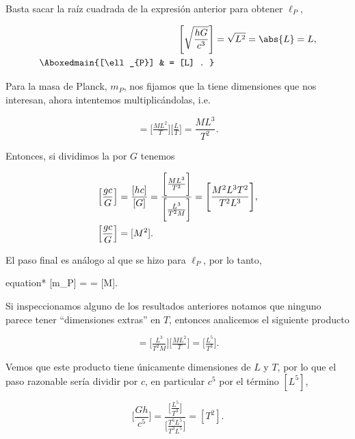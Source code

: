 \documentclass[../main.tex]{subfiles}
\begin{document}
\begin{problema}[10]
	Basta sacar la raíz cuadrada de la expresión anterior para obtener \(\ell_{P}\),

	\begin{align*}
		\Biggl[\sqrt{\dfrac{hG}{c^{3}}}\Biggr] & = \sqrt{L^{2}} = \abs{L} = L, \\
		\Aboxedmain{[\ell_{P}]                 & = [L]
		.
		}
	\end{align*}

	Para la masa de Planck, \(m_{P}\), nos fijamos que la 
	tiene dimensiones que nos interesan, ahora intentemos multiplicándolas, i.e.

	\begin{equation}
		[hc] = \bigl[\tfrac{ML^{2}}{T}\bigr]\bigl[\tfrac{L}{T}\bigr] = \dfrac{ML^{3}}{T^{2}}.
		\label{eq:hTimesC}
	\end{equation}

	Entonces, si dividimos la  por
	\(G\) tenemos

	\begin{align*}
		\Bigl[\dfrac{gc}{G}\Bigr] & = \dfrac{[hc]}{[G]} = \dfrac{\biggl[\tfrac{ML^{3}}{T^{2}}\biggr]}{\biggl[\tfrac{L^{3}}{T^{2}M}\biggr]}
		= \Biggl[\dfrac{M^{2}L^{3}T^{2}}{T^{2}L^{3}}\Biggr],                                                                               \\
		\Bigl[\dfrac{gc}{G}\Bigr] & = [M^{2}].
	\end{align*}

	El paso final es análogo al que se hizo para \(\ell_{P}\), por lo tanto,

	\begin{empheq}[box=\mainresult]{equation*}
		[m_{P}] =  = [M].
	\end{empheq}

	Si inspeccionamos alguno de los resultados anteriores notamos que
	ninguno parece tener ``dimensiones extras'' en \(T\),
	entonces analicemos el siguiente producto

	\begin{equation}
		[Gh] = \biggl[\tfrac{L^{3}}{T^{2}M}\biggr]\biggl[\tfrac{ML^{2}}{T}\biggr]
		= \biggl[\tfrac{L^{5}}{T^{3}}\biggr].
		\label{eq:GTimesH}
	\end{equation}

	Vemos que este producto tiene únicamente dimensiones de \(L\) y \(T\),
	por lo que el paso razonable sería dividir por \(c\), en particular
	\(c^{5}\) por el término \([L^{5}]\),

	\begin{equation*}
		\Biggl[\dfrac{Gh}{c^{5}}\Biggr] = \dfrac{\biggl[\tfrac{L^{5}}{T^{3}}\biggr]}{\biggl[\tfrac{T^{5}L^{5}}{T^{3}L^{5}}\biggr]}
		= [T^{2}].
	\end{equation*}


\end{problema}
\end{document}
